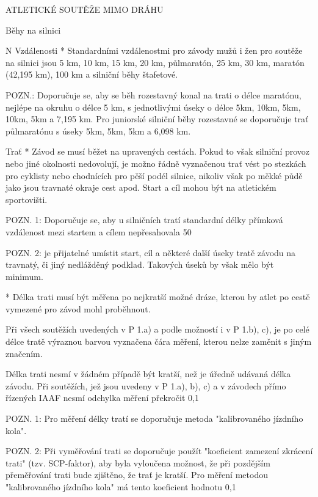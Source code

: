 \sec ATLETICKÉ SOUTĚŽE MIMO DRÁHU

\secc Běhy na silnici

\begitems \style N
Vzdálenosti
* Standardními vzdálenostmi pro závody mužů i žen pro soutěže na silnici jsou 5 km, 10 km, 15 km, 20 km, půlmaratón, 25 km, 30 km, maratón (42,195 km), 100 km a silniční běhy štafetové.

POZN.: Doporučuje se, aby se běh rozestavný konal na trati o délce maratónu, nejlépe na okruhu o délce 5 km, s jednotlivými úseky o délce 5km, 10km, 5km, 10km, 5km a 7,195 km. Pro juniorské silniční běhy rozestavné se doporučuje trať půlmaratónu s úseky 5km, 5km, 5km a 6,098 km.

Trať
* Závod se musí běžet na upravených cestách. Pokud to však silniční provoz nebo jiné okolnosti nedovolují, je možno řádně vyznačenou trať vést po stezkách pro cyklisty nebo chodnících pro pěší podél silnice, nikoliv však po měkké půdě jako jsou travnaté okraje cest apod. Start a cíl mohou být na atletickém sportovišti.

POZN. 1: Doporučuje se, aby u silničních tratí standardní délky přímková vzdálenost mezi startem a cílem nepřesahovala 50 %

POZN. 2: je přijatelné umístit start, cíl a některé další úseky tratě závodu na travnatý, či jiný nedlážděný podklad. Takových úseků by však mělo být minimum.

* Délka trati musí být měřena po nejkratší možné dráze, kterou by atlet po cestě vymezené pro závod mohl proběhnout.

Při všech soutěžích uvedených v P 1.a) a podle možností i v P 1.b), c), je po celé délce tratě výraznou barvou vyznačena čára měření, kterou nelze zaměnit s jiným značením.

Délka trati nesmí v žádném případě být kratší, než je úředně udávaná délka závodu. Při soutěžích, jež jsou uvedeny v P 1.a), b), c) a v závodech přímo řízených IAAF nesmí odchylka měření překročit 0,1 %

POZN. 1: Pro měření délky tratí se doporučuje metoda "kalibrovaného jízdního kola".

POZN. 2: Při vyměřování trati se doporučuje použít "koeficient zamezení zkrácení trati" (tzv. SCP-faktor), aby byla vyloučena možnost, že při pozdějším přeměřování trati bude zjištěno, že trať je kratší. Pro měření metodou "kalibrovaného jízdního kola" má tento koeficient hodnotu 0,1 %

